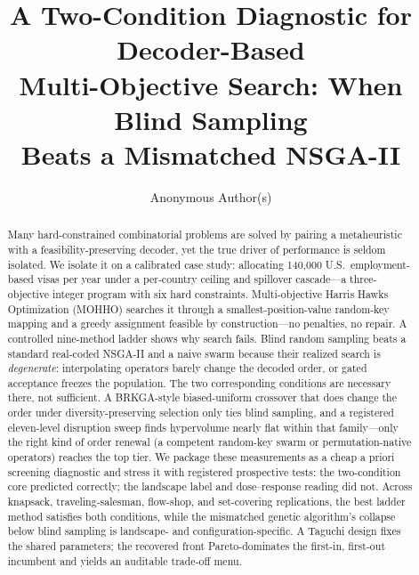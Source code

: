 \documentclass[runningheads]{llncs}
\begin{document}
\title{A Two-Condition Diagnostic for Decoder-Based\texorpdfstring{\\}{ }Multi-Objective Search: When Blind Sampling\texorpdfstring{\\}{ }Beats a Mismatched NSGA-II}

\author{Anonymous Author(s)}

\maketitle

\begin{abstract}
Many hard-constrained combinatorial problems are solved by pairing a metaheuristic with a feasibility-preserving decoder, yet the true driver of performance is seldom isolated. We isolate it on a calibrated case study: allocating 140{,}000 U.S.\ employment-based visas per year under a per-country ceiling and spillover cascade---a three-objective integer program with six hard constraints. Multi-objective Harris Hawks Optimization (MOHHO) searches it through a smallest-position-value random-key mapping and a greedy assignment feasible by construction---no penalties, no repair. A controlled nine-method ladder shows why search fails. Blind random sampling beats a standard real-coded NSGA-II and a naive swarm because their realized search is \emph{degenerate}: interpolating operators barely change the decoded order, or gated acceptance freezes the population. The two corresponding conditions are necessary there, not sufficient. A BRKGA-style biased-uniform crossover that does change the order under diversity-preserving selection only ties blind sampling, and a registered eleven-level disruption sweep finds hypervolume nearly flat within that family---only the right kind of order renewal (a competent random-key swarm or permutation-native operators) reaches the top tier. We package these measurements as a cheap a priori screening diagnostic and stress it with registered prospective tests: the two-condition core predicted correctly; the landscape label and dose--response reading did not. Across knapsack, traveling-salesman, flow-shop, and set-covering replications, the best ladder method satisfies both conditions, while the mismatched genetic algorithm's collapse below blind sampling is landscape- and configuration-specific. A Taguchi design fixes the shared parameters; the recovered front Pareto-dominates the first-in, first-out incumbent and yields an auditable trade-off menu.

\end{abstract}
\end{document}
